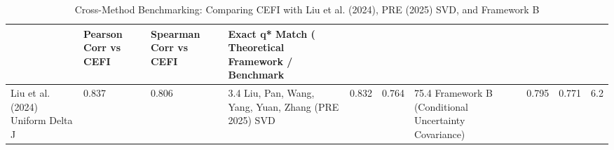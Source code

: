 \begin{table}
\caption{Cross-Method Benchmarking: Comparing CEFI with Liu et al. (2024), PRE (2025) SVD, and Framework B}
\label{tab:cross_framework}
\begin{tabular}{lllll}
\toprule
 & Pearson Corr vs CEFI & Spearman Corr vs CEFI & Exact q* Match (%
Theoretical Framework / Benchmark &  &  &  &  \\
\midrule
Liu et al. (2024) Uniform Delta J & 0.837 & 0.806 & 3.4%
Liu, Pan, Wang, Yang, Yuan, Zhang (PRE 2025) SVD & 0.832 & 0.764 & 75.4%
Framework B (Conditional Uncertainty Covariance) & 0.795 & 0.771 & 6.2%
\bottomrule
\end{tabular}
\end{table}
